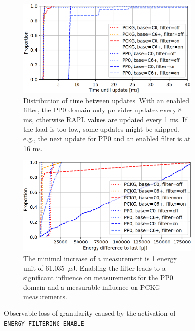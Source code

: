 \begin{itemize}
    \begin{figure}[H]
        \centering
        \begin{subfigure}[t]{0.48\textwidth}
            \includegraphics[width=\textwidth]{Figures/rapl_filter_granularity_loss_time.png}
            \caption{Distribution of time between updates: With an enabled filter, the PP0 domain only provides updates every 8 ms, otherwise RAPL values are updated every 1 ms. If the load is too low, some updates might be skipped, e.g., the next update for PP0 and an enabled filter is at 16 ms.}
            \label{fig:rapl_filter_granularity_loss_time}
        \end{subfigure}
        \hfill
        \begin{subfigure}[t]{0.48\textwidth}
            \includegraphics[width=\textwidth]{Figures/rapl_filter_granularity_loss_energy.png}
            \caption{The minimal increase of a measurement is 1 energy unit of 61.035~$\mu$J. Enabling the filter leads to a significant influence on measurements for the PP0 domain and a measurable influence on PCKG measurements.}
            \label{fig:rapl_filter_granularity_loss_energy}
        \end{subfigure}
        \caption[Observable loss of granularity caused by the activation of \texttt{ENERGY\_FILTERING\_ENABLE}]{Observable loss of granularity caused by the activation of \texttt{ENERGY\_FILTERING\_ENABLE}\parencite{schone2024energy}}
        \label{fig:rapl_filter_granularity_loss}
    \end{figure}
\end{itemize} 

